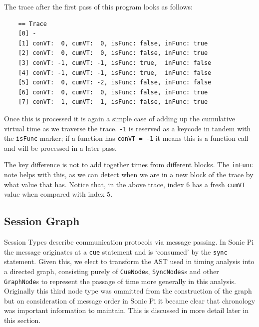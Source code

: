 \documentclass[11pt, abstracton, twoside]{scrartcl}
\begin{document}
The trace after the first pass of this program looks as follows:
\\
\begin{lstlisting}
    == Trace
    [0] -
    [1] conVT:  0, cumVT:  0, isFunc: false, inFunc: true
    [2] conVT:  0, cumVT:  0, isFunc: false, inFunc: true
    [3] conVT: -1, cumVT: -1, isFunc: true,  inFunc: false
    [4] conVT: -1, cumVT: -1, isFunc: true,  inFunc: false
    [5] conVT:  0, cumVT: -2, isFunc: false, inFunc: false
    [6] conVT:  0, cumVT:  0, isFunc: false, inFunc: true
    [7] conVT:  1, cumVT:  1, isFunc: false, inFunc: true
\end{lstlisting}

Once this is processed it is again a simple case of adding up the cumulative virtual
time as we traverse the trace. \texttt{-1} is reserved as a keycode in tandem with
the \texttt{isFunc} marker; if a function has \texttt{conVT = -1} it means this
is a function call and will be processed in a later pass.

The key difference is not to add together times from different blocks. The 
\texttt{inFunc} note helps with this, as we can detect when we are in a new block 
of the trace by what value that has. Notice that, in the above trace, index 6 
has a fresh \texttt{cumVT} value when compared with index 5.







\subsection{Session Graph}
Session Types describe communication protocols via message passing. In Sonic Pi
the message originates at a \texttt{cue} statement and is `consumed' by the
\texttt{sync} statement. Given this, we elect to transform the AST used in
timing analysis into a directed graph, consisting purely of \texttt{CueNode}s,
\texttt{SyncNodes}s and other \texttt{GraphNode}s to represent the passage
of time more generally in this analysis. Originally this third node type
was ommitted from the construction of the graph but on consideration of
message order in Sonic Pi it became clear that chronology was important 
information to maintain. This is discussed in more detail later in this section.
\end{document}
